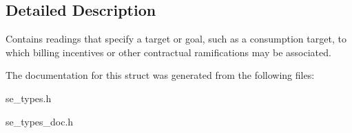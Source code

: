 \subsection{Detailed Description}
Contains readings that specify a target or goal, such as a consumption target, to which billing incentives or other contractual ramifications may be associated. 

The documentation for this struct was generated from the following files\+:\begin{DoxyCompactItemize}
\item 
se\+\_\+types.\+h\item 
se\+\_\+types\+\_\+doc.\+h\end{DoxyCompactItemize}
